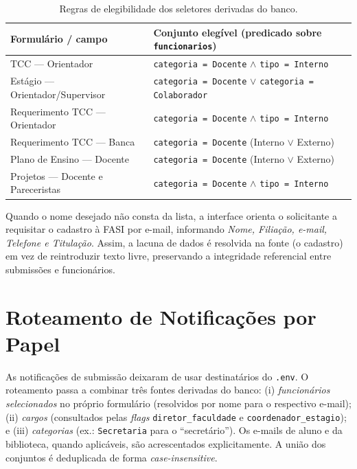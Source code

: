 \documentclass[12pt,a4paper]{report}
\begin{document}
\begin{table}[H]
\centering
\small
\begin{tabularx}{\textwidth}{l X}
\toprule
\textbf{Formulário / campo} & \textbf{Conjunto elegível (predicado sobre \texttt{funcionarios})} \\
\midrule
TCC --- Orientador                 & \texttt{categoria = Docente} $\wedge$ \texttt{tipo = Interno} \\
Estágio --- Orientador/Supervisor  & \texttt{categoria = Docente} $\vee$ \texttt{categoria = Colaborador} \\
Requerimento TCC --- Orientador    & \texttt{categoria = Docente} $\wedge$ \texttt{tipo = Interno} \\
Requerimento TCC --- Banca         & \texttt{categoria = Docente} (Interno $\vee$ Externo) \\
Plano de Ensino --- Docente        & \texttt{categoria = Docente} (Interno $\vee$ Externo) \\
Projetos --- Docente e Pareceristas& \texttt{categoria = Docente} $\wedge$ \texttt{tipo = Interno} \\
\bottomrule
\end{tabularx}
\caption{Regras de elegibilidade dos seletores derivadas do banco.}
\label{tab:seletores}
\end{table}

\begin{insight}[title=Tratamento de ausência no cadastro]
Quando o nome desejado não consta da lista, a interface orienta o solicitante a
requisitar o cadastro à FASI por e-mail, informando \emph{Nome, Filiação,
e-mail, Telefone e Titulação}. Assim, a lacuna de dados é resolvida na fonte
(o cadastro) em vez de reintroduzir texto livre, preservando a integridade
referencial entre submissões e funcionários.
\end{insight}

\section{Roteamento de Notificações por Papel}

As notificações de submissão deixaram de usar destinatários do \texttt{.env}.
O roteamento passa a combinar três fontes derivadas do banco:
(i) \emph{funcionários selecionados} no próprio formulário (resolvidos por nome
para o respectivo e-mail); (ii) \emph{cargos} (consultados pelas \textit{flags}
\texttt{diretor\_faculdade} e \texttt{coordenador\_estagio}); e
(iii) \emph{categorias} (ex.: \texttt{Secretaria} para o ``secretário'').
Os e-mails de aluno e da biblioteca, quando aplicáveis, são acrescentados
explicitamente. A união dos conjuntos é deduplicada de forma
\textit{case-insensitive}.
\end{document}
